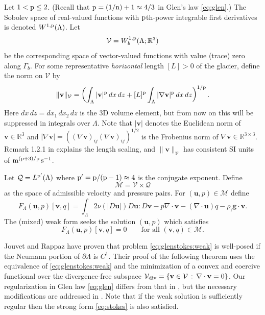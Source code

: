\documentclass[hidelinks,onefignum,onetabnum,final]{siamart220329}  %
\newcommand{\RR}{\mathbb{R}}
\newcommand{\grad}{\nabla}
\newcommand{\Div}{\nabla\cdot}
\newcommand{\bg}{\mathbf{g}}
\newcommand{\bu}{\mathbf{u}}
\newcommand{\bv}{\mathbf{v}}
\newcommand{\cQ}{\mathcal{Q}}
\newcommand{\cV}{\mathcal{V}}
\newcommand{\nn}{{\text{\textnormal{n}}}}
\newcommand{\pp}{{\text{\textnormal{p}}}}
\newcommand{\rhoi}{\rho_{\text{i}}}
\newcommand{\Vdiv}{\cV_{\text{\textnormal{div}}}}
\begin{document}
Let $1 < \pp \le 2$.  (Recall that $\pp=(1/\nn)+1\approx 4/3$ in Glen's law \eqref{eq:glen}.)  The Sobolev space \cite{Evans2010} of real-valued functions with $\pp$th-power integrable first derivatives is denoted $W^{1,\pp}(\Lambda)$.  Let
\begin{equation}
\cV = W_b^{1,\pp}(\Lambda; \RR^3) \label{eq:defineV}
\end{equation}
be the corresponding space of vector-valued functions with value (trace) zero along $\Gamma_b$.  For some representative \emph{horizontal} length $[L]>0$ of the glacier, define the norm on $\cV$ by
\begin{equation}
\|\bv\|_{\cV} = \left(\int_\Lambda |\bv|^\pp\,dx\,dz + [L]^\pp \int_\Lambda |\grad\bv|^\pp\,dx\,dz\right)^{1/\pp}.
\end{equation}
Here $dx\,dz = dx_1\,dx_2\,dz$ is the 3D volume element, but from now on this will be suppressed in integrals over $\Lambda$.  Note that $|\bv|$ denotes the Euclidean norm of $\bv\in\RR^3$ and $|\grad\bv|=\left((\grad\bv)_{ij} (\grad\bv)_{ij}\right)^{1/2}$ is the Frobenius norm of $\grad\bv\in\RR^{3\times 3}$.  Remark 1.2.1 in \cite{BoffiBrezziFortin2013} explains the length scaling, and $\|\bv\|_{\cV}$ has consistent SI units of $\text{m}^{(\pp+3)/\pp}\,\text{s}^{-1}$.

Let $\cQ=L^{\pp'}(\Lambda)$ where $\pp'=\pp/(\pp-1)\approx 4$ is the conjugate exponent.  Define
\begin{equation}
\mathcal{M} = \cV \times \cQ \label{eq:glenstokes:mixedspace}
\end{equation}
as the space of admissible velocity and pressure pairs.  For $(\bu,p) \in \mathcal{M}$ define
\begin{equation}
F_\Lambda(\bu,p)[\bv,q] = \int_\Lambda 2 \nu(|D\bu|) D\bu : D\bv - p \Div\bv - (\Div\bu) q - \rhoi \bg \cdot \bv. \label{eq:glenstokes:fcnl}
\end{equation}
The (mixed) weak form seeks the solution $(\bu,p)$ which satisfies
\begin{equation}
F_\Lambda(\bu,p)[\bv,q] = 0 \qquad \text{for all } (\bv,q) \in \mathcal{M}. \label{eq:glenstokes:weak}
\end{equation}

Jouvet and Rappaz \cite{JouvetRappaz2011} have proven that problem \eqref{eq:glenstokes:weak} is well-posed if the Neumann portion of $\partial\Lambda$ is $C^1$.  Their proof of the following theorem uses the equivalence of \eqref{eq:glenstokes:weak} and the minimization of a convex and coercive functional over the divergence-free subspace $\Vdiv = \{\bv\in\cV\,:\,\Div\bv=0\}$.  Our regularization in Glen law \eqref{eq:glen} differs from that in \cite{JouvetRappaz2011}, but the necessary modifications are addressed in \cite{IsaacStadlerGhattas2015}.  Note that if the weak solution is sufficiently regular then the strong form \eqref{eq:stokes} is also satisfied.
\end{document}
